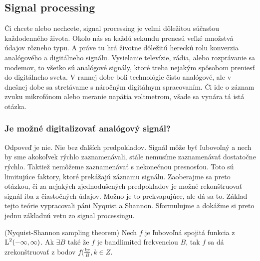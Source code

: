 \subsection{Signal processing}

Či chcete alebo nechcete, signal processing je veľmi dôležitou
súčasťou každodenného života. Okolo nás sa každú sekundu prenesú veľké
množstvá údajov rôzneho typu. A práve tu hrá životne dôležitú hereckú
rolu konverzia analógového a digitálneho signálu. Vysielanie
televízie, rádia, alebo rozprávanie sa modemov, to všetko sú analógové
signály, ktoré treba nejakým spôsobom preniesť do digitálneho sveta. V
rannej dobe boli technológie čisto analógové, ale v dnešnej dobe sa
stretávame s náročným digitálnym spracovaním. Či ide o záznam zvuku
mikrofónom alebo meranie napätia voltmetrom, všade sa vynára tá istá
otázka.

\subsubsection{Je možné digitalizovať analógový signál?}

Odpoveď je nie. Nie bez ďalších predpokladov. Signál môže byť
ľubovoľný a nech by sme akokoľvek rýchlo zaznamenávali, stále nemusíme
zaznamenávať dostatočne rýchlo. Taktiež nemôžeme zaznamenávať s
nekonečnou presnosťou. Toto sú limitujúce faktory, ktoré prekážajú
záznamu signálu. Zaoberajme sa preto otázkou, či za nejakých
zjednodušených predpokladov je možné rekonštruovať signál iba z
čiastočných údajov. Možno je to prekvapujúce, ale dá sa to. Základ
tejto teórie vypracovali páni Nyquist a Shannon. Sformulujme a dokážme
si preto jednu základnú vetu zo signal processingu.

\begin{veta}
    (Nyquist-Shannon sampling theorem) Nech $f$ je ľubovoľná spojitá
    funkcia z $\mbox{L}^2(-\infty,\infty)$. Ak $\exists B$ také že $f$ je bandlimited
    frekvenciou $B$, tak $f$ sa dá zrekonštruovať z bodov $f(\frac{k
    \pi}{B}, k\in Z$. 
\end{veta}


